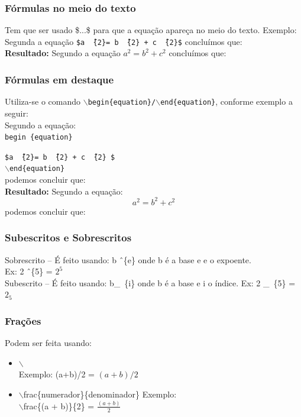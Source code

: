 \documentclass[12pt]{article}
\begin{document}
			\subsubsection{Fórmulas no meio do texto}
			
			Tem que ser usado \$...\$ para que a equação apareça no meio do texto.
			Exemplo: 
			Segunda a equação \texttt{\$a \^\ \{{2}\}= b \^\ \{{2}\} + c \^\ \{{2}\}\$} concluímos que:\\
			\textbf{Resultado: }Segundo a equação $a^{2}= b^{2}+c^{2}$ concluímos que:
			
			\subsubsection{Fórmulas em destaque}
				Utiliza-se o comando \texttt{$\backslash$begin\{{equation}\}/$\backslash$end\{{equation}\}}, conforme exemplo a seguir:\\
				Segundo a equação:\\
				\texttt{begin \{{equation}\}} 
				
				\texttt{\$a \^\ \{{2}\}= b \^\ \{{2}\} + c \^\ \{{2}\} \$} \\
				\texttt{$\backslash$end\{{equation}\}} \\
				podemos concluir que: \\
				\textbf{Resultado: }Segundo a equação:
				\begin{equation}
					a^{2}= b^{2}+c^{2}
				\end{equation}
				podemos concluir que:
			
			\subsubsection{Subescritos e Sobrescritos}
				Sobrescrito – É feito usando: b \^\ \{{e}\} onde b é a base e e o expoente.\\
				Ex: 2 \^\ \{{5}\} = $2^{5}$ \\
				Subescrito – É feito usando: b\_\ \{{i}\} onde b é a base e i o índice.
				Ex: 2 \_\ \{{5}\} = $2_{5}$
				
			\subsubsection{Frações}
				Podem ser feita usando:
				\begin{itemize}
					\item $\backslash$ \\
					Exemplo: (a+b)/2 = $(a + b)/2$
					\item $\backslash$frac\{{numerador}\}\{{denominador}\}
					Exemplo: \\ $\backslash$frac\{{(a + b)}\}\{{2}\} = $\frac{(a + b)}{2}$
				\end{itemize}
			
\end{document}
